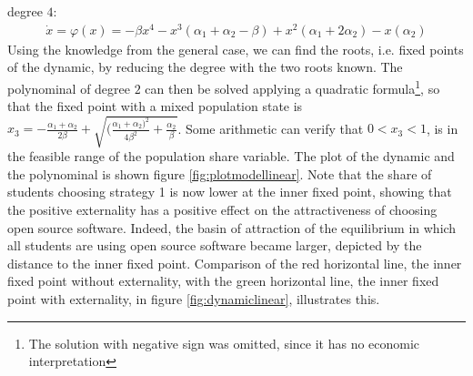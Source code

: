 \documentclass[11pt]{article}
\begin{document}
degree $4$:
\begin{align}
        \dot{x} = \varphi(x) = -\beta x^4 -x^3(\alpha_1 + \alpha_2 
        - \beta ) + x^2 (\alpha_1 + 2 \alpha_2) - x(\alpha_2)
\end{align}
Using the knowledge from the general case, we can find the roots, i.e. fixed
points of the dynamic, by reducing the degree with the two roots known. The
polynominal of degree $2$ can then be solved applying a quadratic formula\footnote{
The solution with negative sign was omitted, since it has no economic 
interpretation}, so that the fixed point with a mixed population state is
$x_3 = -\frac{\alpha_1+\alpha_2}{2 \beta} + 
\sqrt{(\frac{\alpha_1+\alpha_2)^2}{4\beta^2} +\frac{\alpha_2}{\beta}}$. 
Some arithmetic can verify that $0<x_3<1$, is in the feasible range of the
population share variable. The plot of the dynamic and the polynominal is 
shown figure \ref{fig:plotmodellinear}.
Note that the share of students choosing strategy 1 is now lower at the 
inner fixed point, showing that the positive externality has a positive 
effect on the attractiveness of choosing open source software. Indeed,
the basin of attraction of the equilibrium in which all students are using 
open source software became larger, depicted by the distance to the
inner fixed point.
Comparison of the red horizontal line, the inner fixed point without externality,
with the green horizontal line, the inner fixed point with externality,
in figure \ref{fig:dynamiclinear}, illustrates this. 
\end{document}

